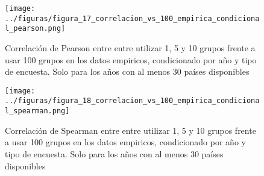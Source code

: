 \begin{figure}[H] %
    \centering %
    \texttt{[image: ../figuras/figura\_17\_correlacion\_vs\_100\_empirica\_condicional\_pearson.png]} %
    \caption{Correlación de Pearson entre entre utilizar 1, 5 y 10 grupos frente a usar 100 grupos en los datos empiricos, condicionado por año y tipo de encuesta. Solo para los años con al menos 30 países disponibles}
    \label{fig:17} %
\end{figure}

\begin{figure}[H] %
    \centering %
    \texttt{[image: ../figuras/figura\_18\_correlacion\_vs\_100\_empirica\_condicional\_spearman.png]} %
    \caption{Correlación de Spearman entre entre utilizar 1, 5 y 10 grupos frente a usar 100 grupos en los datos empiricos, condicionado por año y tipo de encuesta. Solo para los años con al menos 30 países disponibles}
    \label{fig:18} %
\end{figure}

